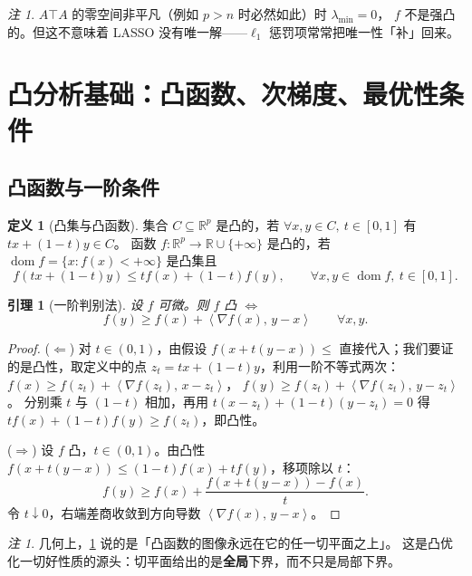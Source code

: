 \documentclass[11pt,a4paper,UTF8]{ctexart}
\theoremstyle{plain}
\newtheorem{lemma}[theorem]{引理}
\theoremstyle{definition}
\newtheorem{definition}[theorem]{定义}
\theoremstyle{remark}
\newtheorem{remark}[theorem]{注}
\newcommand{\R}{\mathbb{R}}
\newcommand{\inner}[2]{\left\langle #1,\, #2 \right\rangle}
\newcommand{\dom}{\operatorname{dom}}
\begin{document}
\begin{remark}
$A\top A$ 的零空间非平凡（例如 $p>n$ 时必然如此）时 $\lambda_{\min}=0$，
$f$ 不是强凸的。但这不意味着 LASSO 没有唯一解——$\ell_1$ 惩罚项常常把唯一性「补」回来。
\end{remark}

\section{凸分析基础：凸函数、次梯度、最优性条件}

\subsection{凸函数与一阶条件}

\begin{definition}[凸集与凸函数]
集合 $C\subseteq\R^p$ 是凸的，若 $\forall x,y\in C,\ t\in[0,1]$ 有 $tx+(1-t)y\in C$。
函数 $f:\R^p\to\R\cup\{+\infty\}$ 是凸的，若 $\dom f=\{x:f(x)<+\infty\}$ 是凸集且
\[
f(tx+(1-t)y)\le t f(x)+(1-t)f(y),\qquad\forall x,y\in\dom f,\ t\in[0,1].
\]
\end{definition}

\begin{lemma}[一阶判别法]\label{lem:firstorder}
设 $f$ 可微。则 $f$ 凸 $\iff$
\[
f(y)\ge f(x)+\inner{\nabla f(x)}{y-x}\qquad\forall x,y.
\]
\end{lemma}

\begin{proof}
($\Leftarrow$) 对 $t\in(0,1)$，由假设
$f(x+t(y-x))\le$ 直接代入；我们要证的是凸性，取定义中的点
$z_t=tx+(1-t)y$，利用一阶不等式两次：
$f(x)\ge f(z_t)+\inner{\nabla f(z_t)}{x-z_t}$，
$f(y)\ge f(z_t)+\inner{\nabla f(z_t)}{y-z_t}$。
分别乘 $t$ 与 $(1-t)$ 相加，再用 $t(x-z_t)+(1-t)(y-z_t)=0$ 得
$tf(x)+(1-t)f(y)\ge f(z_t)$，即凸性。

($\Rightarrow$) 设 $f$ 凸，$t\in(0,1)$。由凸性
$f(x+t(y-x))\le(1-t)f(x)+tf(y)$，移项除以 $t$：
\[
f(y)\ge f(x)+\frac{f(x+t(y-x))-f(x)}{t}.
\]
令 $t\downarrow0$，右端差商收敛到方向导数 $\inner{\nabla f(x)}{y-x}$。
\end{proof}

\begin{remark}
几何上，\ref{lem:firstorder} 说的是「凸函数的图像永远在它的任一切平面之上」。
这是凸优化一切好性质的源头：切平面给出的是\textbf{全局}下界，而不只是局部下界。
\end{remark}
\end{document}

